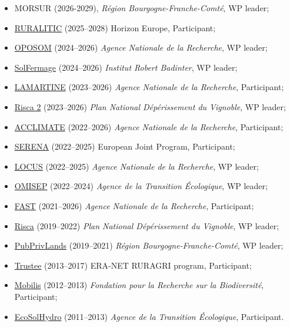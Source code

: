\documentclass[12pt, a4paper]{./style}
\begin{document}
\begin{itemize}
\item MORSUR (2026-2029), \emph{Région Bourgogne-Franche-Comté},
WP leader;
\item \href{https://www.inrae.fr/en/news/ruralitic-rethinking-european-rural-areas-face-new-realities-challenges-and-transitions}{RURALITIC} (2025--2028) Horizon Europe, Participant;
\item \href{https://anr.fr/Projet-ANR-23-CE41-0007}{OPOSOM} (2024--2026) \emph{Agence Nationale de la
Recherche}, WP leader;
\item \href{https://www.pacte-grenoble.fr/fr/recherche-0/projets-recherche/solfermage}{SolFermage} (2024--2026) \emph{Institut Robert Badinter}, WP
leader;
\item \href{https://anr.fr/Project-ANR-23-CE55-0008}{LAMARTINE} (2023--2026) \emph{Agence Nationale de la
Recherche}, Participant;
\item \href{https://www.plan-deperissement-vigne.fr/recherches/programmes-de-recherche/risca-ii}{Risca 2} (2023--2026) \emph{Plan National Dépérissement du
Vignoble}, WP leader;
\item \href{https://anr.fr/Projet-ANR-22-CE55-0004}{ACCLIMATE} (2022--2026) \emph{Agence Nationale de la
Recherche}, Participant;
\item \href{https://ejpsoil.eu/soil-research/serena}{SERENA} (2022--2025) European Joint Program,
Participant;
\item \href{https://anr.fr/Project-ANR-21-CE03-0007}{LOCUS} (2022--2025) \emph{Agence Nationale de la Recherche},
WP leader;
\item \href{https://www.ademe.fr/en/frontpage/}{OMISEP} (2022--2024) \emph{Agence de la Transition
Écologique}, WP leader;
\item \href{https://sites.google.com/view/ppr-fast-project}{FAST} (2021--2026) \emph{Agence Nationale de la Recherche},
Participant;
\item \href{https://www.plan-deperissement-vigne.fr/travaux-de-recherche/programmes-de-recherche/risca}{Risca} (2019--2022) \emph{Plan National Dépérissement du
Vignoble}, WP leader;
\item \href{http://www.ubfc.fr/pubprivlands/}{PubPrivLands} (2019--2021) \emph{Région
Bourgogne-Franche-Comté}, WP leader;
\item \href{https://www.trustee-project.eu/}{Trustee} (2013--2017) ERA-NET RURAGRI program,
Participant;
\item \href{https://www.fondationbiodiversite.fr/en/}{Mobilis} (2012--2013) \emph{Fondation pour la Recherche sur
la Biodiversité}, Participant;
\item \href{http://www.gessol.fr/content/integrer-la-valeur-epuratrice-de-sols-hydromorphes-dans-leur-usage-quelles-strategies-d-inte}{EcoSolHydro} (2011--2013) \emph{Agence de la Transition
Écologique}, Participant.
\end{itemize}
\label{sec:org88e187b}
\end{document}
